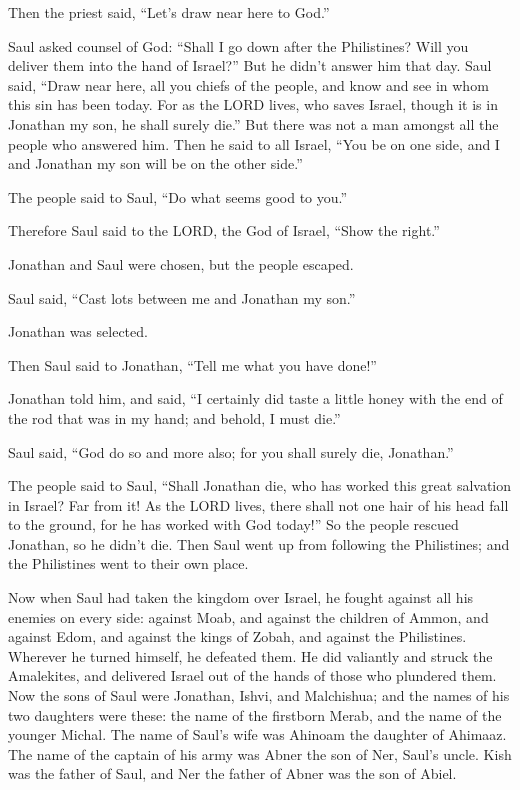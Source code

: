 Then the priest said, ``Let's draw near here to God.''

 Saul asked counsel of God: ``Shall I go down after the
Philistines? Will you deliver them into the hand of Israel?'' But he
didn't answer him that day.  Saul said, ``Draw near here,
all you chiefs of the people, and know and see in whom this sin has been
today.  For as the LORD lives, who saves Israel, though
it is in Jonathan my son, he shall surely die.'' But there was not a man
amongst all the people who answered him.  Then he said to
all Israel, ``You be on one side, and I and Jonathan my son will be on
the other side.''

The people said to Saul, ``Do what seems good to you.''

 Therefore Saul said to the LORD, the God of Israel,
``Show the right.''

Jonathan and Saul were chosen, but the people escaped.

 Saul said, ``Cast lots between me and Jonathan my son.''

Jonathan was selected.

 Then Saul said to Jonathan, ``Tell me what you have
done!''

Jonathan told him, and said, ``I certainly did taste a little honey with
the end of the rod that was in my hand; and behold, I must die.''

 Saul said, ``God do so and more also; for you shall
surely die, Jonathan.''

 The people said to Saul, ``Shall Jonathan die, who has
worked this great salvation in Israel? Far from it! As the LORD lives,
there shall not one hair of his head fall to the ground, for he has
worked with God today!'' So the people rescued Jonathan, so he didn't
die.  Then Saul went up from following the Philistines;
and the Philistines went to their own place.

 Now when Saul had taken the kingdom over Israel, he
fought against all his enemies on every side: against Moab, and against
the children of Ammon, and against Edom, and against the kings of Zobah,
and against the Philistines. Wherever he turned himself, he defeated
them.  He did valiantly and struck the Amalekites, and
delivered Israel out of the hands of those who plundered them.
 Now the sons of Saul were Jonathan, Ishvi, and
Malchishua; and the names of his two daughters were these: the name of
the firstborn Merab, and the name of the younger Michal. 
The name of Saul's wife was Ahinoam the daughter of Ahimaaz. The name of
the captain of his army was Abner the son of Ner, Saul's uncle.
 Kish was the father of Saul, and Ner the father of Abner
was the son of Abiel.

